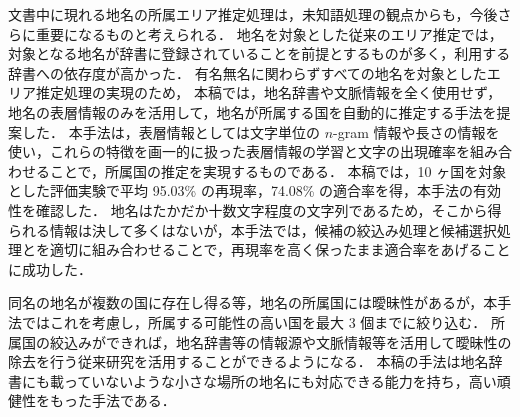 \documentclass[japanese]{jnlp_1.4}
\begin{document}
文書中に現れる地名の所属エリア推定処理は，未知語処理の観点からも，今後さらに重要になるものと考えられる．
地名を対象とした従来のエリア推定では，対象となる地名が辞書に登録されていることを前提とするものが多く，利用する辞書への依存度が高かった．
有名無名に関わらずすべての地名を対象としたエリア推定処理の実現のため，
本稿では，地名辞書や文脈情報を全く使用せず，地名の表層情報のみを活用して，地名が所属する国を自動的に推定する手法を提案した．
本手法は，表層情報としては文字単位の $n$-gram 情報や長さの情報を使い，これらの特徴を画一的に扱った表層情報の学習と文字の出現確率を組み合わせることで，所属国の推定を実現するものである．
本稿では，10 ヶ国を対象とした評価実験で平均 95.03\% の再現率，74.08\% の適合率を得，本手法の有効性を確認した．
地名はたかだか十数文字程度の文字列であるため，そこから得られる情報は決して多くはないが，本手法では，候補の絞込み処理と候補選択処理とを適切に組み合わせることで，再現率を高く保ったまま適合率をあげることに成功した．

同名の地名が複数の国に存在し得る等，地名の所属国には曖昧性があるが，本手法ではこれを考慮し，所属する可能性の高い国を最大 3 個までに絞り込む．
所属国の絞込みができれば，地名辞書等の情報源や文脈情報等を活用して曖昧性の除去を行う従来研究を活用することができるようになる．
本稿の手法は地名辞書にも載っていないような小さな場所の地名にも対応できる能力を持ち，高い頑健性をもった手法である．
\end{document}
